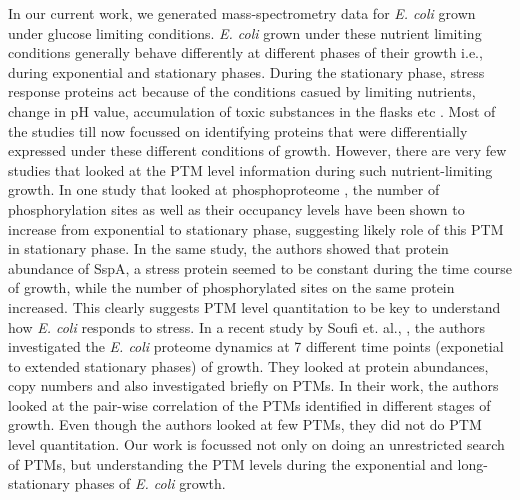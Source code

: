 \documentclass[12pt]{article}
\begin{document}

In our current work, we generated mass-spectrometry data for \emph{E. coli} grown under glucose limiting conditions. \emph{E. coli} grown under these nutrient limiting conditions generally behave differently at different phases of their growth i.e., during exponential and stationary phases. During the stationary phase, stress response proteins act because of the conditions casued by limiting nutrients, change in pH value, accumulation of toxic substances in the flasks etc \cite{Nystrom2004}. Most of the studies till now focussed on identifying proteins that were differentially expressed under these different conditions of growth. However, there are very few studies that looked at the PTM level information during such nutrient-limiting growth. In one study that looked at phosphoproteome \cite{Soaresetal2013}, the number of phosphorylation sites as well as their occupancy levels have been shown to increase from exponential to stationary phase, suggesting likely role of this PTM in stationary phase. In the same study, the authors showed that protein abundance of SspA, a stress protein seemed to be constant during the time course of growth, while the number of phosphorylated sites on the same protein increased. This clearly suggests PTM level quantitation to be key to understand how \emph{E. coli} responds to stress. In a recent study by Soufi et. al., \cite{Soufietal2015}, the authors investigated the \emph{E. coli} proteome dynamics at 7 different time points (exponetial to extended stationary phases) of growth. They looked at protein abundances, copy numbers and also investigated briefly on PTMs. In their work, the authors looked at the pair-wise correlation of the PTMs identified in different stages of growth. Even though the authors looked at few PTMs, they did not do PTM level quantitation. Our work is focussed not only on doing an unrestricted search of PTMs, but understanding the PTM levels during the exponential and long-stationary phases of \emph{E. coli} growth.

\end{document}
